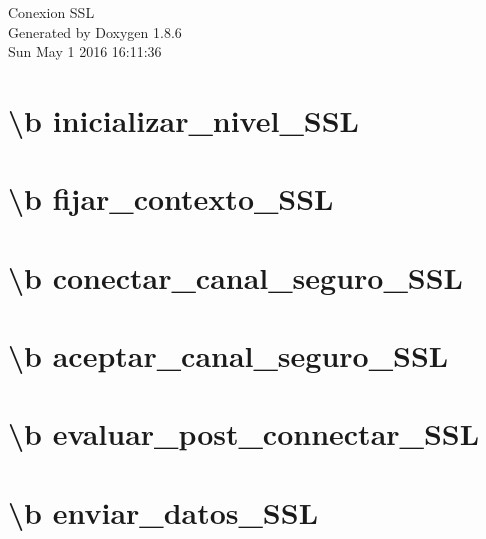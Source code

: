 \documentclass[twoside]{book}
\newcommand{\clearemptydoublepage}{%
  \newpage{\pagestyle{empty}\cleardoublepage}%
}
\begin{document}
\hypersetup{pageanchor=false}
\begin{titlepage}
\vspace*{7cm}
\begin{center}%
{\Large Conexion S\-S\-L }\\
\vspace*{1cm}
{\large Generated by Doxygen 1.8.6}\\
\vspace*{0.5cm}
{\small Sun May 1 2016 16:11:36}\\
\end{center}
\end{titlepage}
\clearemptydoublepage
\tableofcontents
\clearemptydoublepage
{}
\hypersetup{pageanchor=true}

\chapter{\textbackslash{}b inicializar\-\_\-nivel\-\_\-\-S\-S\-L}
\label{inicializar_nivel_SSL}
\hypertarget{inicializar_nivel_SSL}{}

\chapter{\textbackslash{}b fijar\-\_\-contexto\-\_\-\-S\-S\-L}
\label{fijar_contexto_SSL}
\hypertarget{fijar_contexto_SSL}{}

\chapter{\textbackslash{}b conectar\-\_\-canal\-\_\-seguro\-\_\-\-S\-S\-L}
\label{conectar_canal_seguro_SSL}
\hypertarget{conectar_canal_seguro_SSL}{}

\chapter{\textbackslash{}b aceptar\-\_\-canal\-\_\-seguro\-\_\-\-S\-S\-L}
\label{aceptar_canal_seguro_SSL}
\hypertarget{aceptar_canal_seguro_SSL}{}

\chapter{\textbackslash{}b evaluar\-\_\-post\-\_\-connectar\-\_\-\-S\-S\-L}
\label{evaluar_post_connectar_SSL}
\hypertarget{evaluar_post_connectar_SSL}{}

\chapter{\textbackslash{}b enviar\-\_\-datos\-\_\-\-S\-S\-L}
\label{enviar_datos_SSL}
\hypertarget{enviar_datos_SSL}{}

\end{document}
